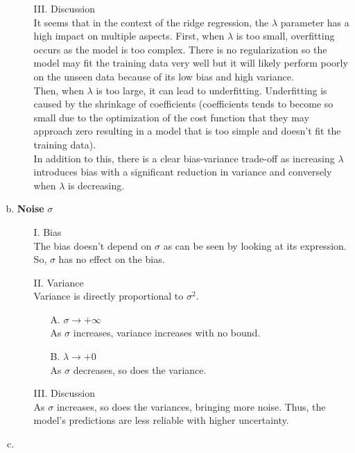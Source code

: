 \documentclass[12pt,titlepage]{article}
\begin{document}
\begin{enumerate}[a.]
\begin{itemize}
        \item[III.] Discussion \\
        It seems that in the context of the ridge regression, the $\lambda$ parameter has a high impact on multiple aspects. First, when $\lambda$ is too small, overfitting occurs as the model is too complex. There is no regularization so the model may fit the training data very well but it will likely perform poorly on the unseen data because of its low bias and high variance. \\
        Then, when $\lambda$ is too large, it can lead to underfitting. Underfitting is caused by the shrinkage of coefficients (coefficients tends to become so small due to the optimization of the cost function that they may approach zero resulting in a model that is too simple and doesn't fit the training data). \\
        In addition to this, there is a clear bias-variance trade-off as increasing $\lambda$ introduces bias with a significant reduction in variance and conversely when $\lambda$ is decreasing.
    \end{itemize}
    \item 
    \textbf{Noise} $\sigma$ \\
    \begin{itemize}
        \item[I.] Bias \\
        The bias doesn't depend on $\sigma$ as can be seen by looking at its expression. So, $\sigma$ has no effect on the bias.
        \item[II.] Variance \\
        Variance is directly proportional to $\sigma^{2}$.
        \begin{itemize}
            \item[A.] $\sigma \rightarrow +\infty$ \\
            As $\sigma$ increases, variance increases with no bound.
            \item[B.] $\lambda \rightarrow +0$ \\
            As $\sigma$ decreases, so does the variance.
        \end{itemize}
        \item[III.] Discussion \\
        As $\sigma$ increases, so does the variances, bringing more noise. Thus, the model's predictions are less reliable with higher uncertainty.
    \end{itemize}
    \item 

\end{enumerate}
\end{document}
